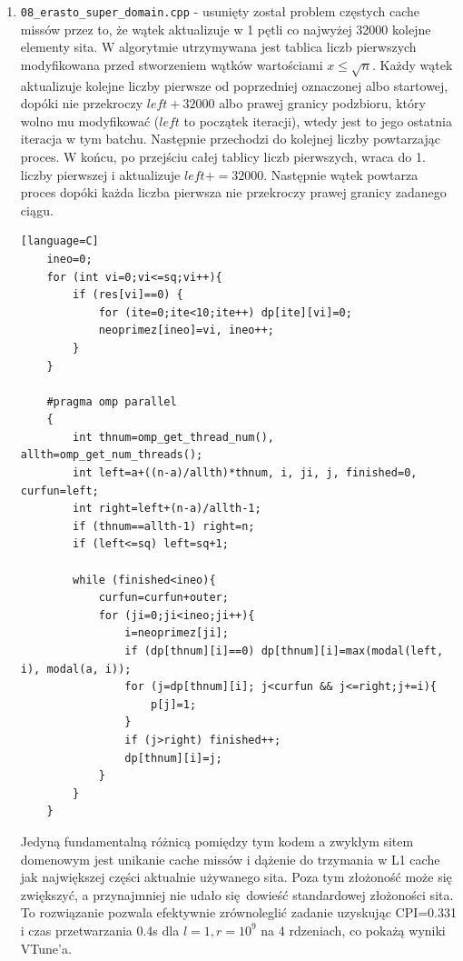 \documentclass[12pt]{article}
\begin{document}
\begin {enumerate}
	\item \texttt{08\_erasto\_super\_domain.cpp} - usunięty został problem częstych cache missów przez to, że wątek aktualizuje w 1 pętli co najwyżej 32000 kolejne elementy sita. W algorytmie utrzymywana jest tablica liczb pierwszych modyfikowana przed stworzeniem wątków wartościami \(x\le \sqrt{n}\). Każdy wątek aktualizuje kolejne liczby pierwsze od poprzedniej oznaczonej albo startowej, dopóki nie przekroczy \(left+32000\) albo prawej granicy podzbioru, który wolno mu modyfikować (\(left\) to początek iteracji), wtedy jest to jego ostatnia iteracja w tym batchu. Następnie przechodzi do kolejnej liczby powtarzając proces. W końcu, po przejściu całej tablicy liczb pierwszych, wraca do 1. liczby pierwszej i aktualizuje \(left+=32000\). Następnie wątek powtarza proces dopóki każda liczba pierwsza nie przekroczy prawej granicy zadanego ciągu.
	\begin{lstlisting}[style=mystyle, caption= Sito funkcyjne z dynamic schedulingiem][language=C]
	ineo=0;
	for (int vi=0;vi<=sq;vi++){
		if (res[vi]==0) {
			for (ite=0;ite<10;ite++) dp[ite][vi]=0;
			neoprimez[ineo]=vi, ineo++;
		}
	}
	
	#pragma omp parallel
	{
		int thnum=omp_get_thread_num(), allth=omp_get_num_threads();
		int left=a+((n-a)/allth)*thnum, i, ji, j, finished=0, curfun=left;
		int right=left+(n-a)/allth-1;
		if (thnum==allth-1) right=n;
		if (left<=sq) left=sq+1;
		
		while (finished<ineo){
			curfun=curfun+outer;
			for (ji=0;ji<ineo;ji++){
				i=neoprimez[ji];
				if (dp[thnum][i]==0) dp[thnum][i]=max(modal(left, i), modal(a, i));
				for (j=dp[thnum][i]; j<curfun && j<=right;j+=i){
					p[j]=1;	
				}
				if (j>right) finished++;
				dp[thnum][i]=j;
			}
		}
	}
\end{lstlisting}
Jedyną fundamentalną różnicą pomiędzy tym kodem a zwykłym sitem domenowym jest unikanie cache missów i dążenie do trzymania w L1 cache jak największej części aktualnie używanego sita. Poza tym złożoność może się zwiększyć, a przynajmniej nie udało się dowieść standardowej złożoności sita. To rozwiązanie pozwala efektywnie zrównoleglić zadanie uzyskując CPI=0.331 i czas przetwarzania 0.4s dla \(l=1, r=10^9\) na 4 rdzeniach, co pokażą wyniki VTune'a.


\end{enumerate}
\end{document}
